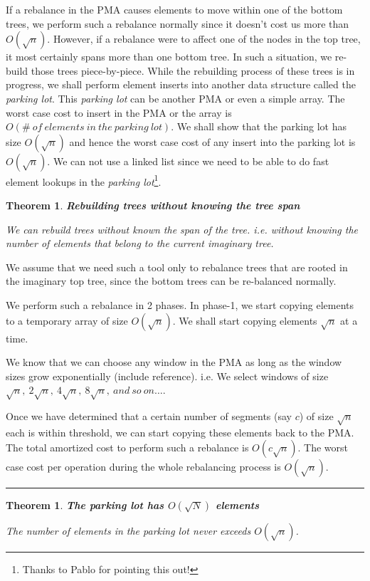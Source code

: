\documentclass{article}
\newenvironment{proof}{{\bf Proof:  }}{\hfill\rule{2mm}{2mm}}
\newtheorem{theorem}[fact]{Theorem}
\begin{document}
If a rebalance in the PMA causes elements to move within one of the
bottom trees, we perform such a rebalance normally since it doesn't
cost us more than $O(\sqrt{n})$. However, if a rebalance were to
affect one of the nodes in the top tree, it most certainly spans more
than one bottom tree. In such a situation, we re-build those trees
piece-by-piece. While the rebuilding process of these trees is in
progress, we shall perform element inserts into another data structure
called the \textit{parking lot}. This \textit{parking lot} can be
another PMA or even a simple array. The worst case cost to insert in
the PMA or the array is
$O(\#\ of\ elements\ in\ the\ parking\ lot)$. We shall show that the
parking lot has size $O(\sqrt{n})$ and hence the worst case cost of
any insert into the parking lot is $O(\sqrt{n})$. We can not use a
linked list since we need to be able to do fast element lookups in the
\textit{parking lot}\footnote{Thanks to Pablo for pointing this out!}.

\begin{theorem}
\textbf{Rebuilding trees without knowing the tree span}

We can rebuild trees without known the span of the tree. i.e. without
knowing the number of elements that belong to the current imaginary
tree.
\end{theorem}

\begin{proof}
We assume that we need such a tool only to rebalance trees that are
rooted in the imaginary top tree, since the bottom trees can be
re-balanced normally.

We perform such a rebalance in 2 phases. In phase-1, we start copying
elements to a temporary array of size $O(\sqrt{n})$. We shall start
copying elements $\sqrt{n}$ at a time.

We know that we can choose any window in the PMA as long as the window
sizes grow exponentially (include reference). i.e. We select windows
of size
$\sqrt{n},\ 2\sqrt{n},\ 4\sqrt{n},\ 8\sqrt{n},\ and\ so\ on\ldots{}$.

Once we have determined that a certain number of segments (say $c$) of
size $\sqrt{n}$ each is within threshold, we can start copying these
elements back to the PMA. The total amortized cost to perform such a
rebalance is $O(c\sqrt{n})$. The worst case cost per operation during
the whole rebalancing process is $O(\sqrt{n})$.
\end{proof}

\begin{theorem}
\textbf{The parking lot has $O(\sqrt{N})$ elements}

The number of elements in the parking lot never exceeds $O(\sqrt{n})$.
\end{theorem}
\end{document}
